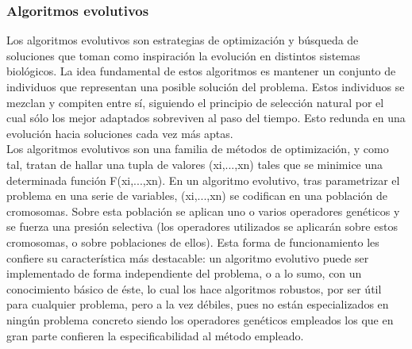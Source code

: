 \documentclass{article}
\begin{document}
\subsubsection{Algoritmos evolutivos}
Los algoritmos evolutivos son estrategias de optimización y búsqueda de soluciones que toman como inspiración la evolución en distintos sistemas biológicos. La idea fundamental de estos algoritmos es mantener un conjunto de individuos que representan una posible solución del problema. Estos individuos se mezclan y compiten entre sí, siguiendo el principio de selección natural por el cual sólo los mejor adaptados sobreviven al paso del tiempo. Esto redunda en una evolución hacia soluciones cada vez más aptas\cite{rf1}. \\
Los algoritmos evolutivos son una familia de métodos de optimización, y como tal, tratan de hallar una tupla de valores (xi,...,xn) tales que se minimice una determinada función F(xi,...,xn). En un algoritmo evolutivo, tras parametrizar el problema en una serie de variables, (xi,...,xn) se codifican en una población de cromosomas. Sobre esta población se aplican uno o varios operadores genéticos y se fuerza una presión selectiva (los operadores utilizados se aplicarán sobre estos cromosomas, o sobre poblaciones de ellos). Esta forma de funcionamiento les confiere su característica más destacable: un algoritmo evolutivo puede ser implementado de forma independiente del problema, o a lo sumo, con un conocimiento básico de éste, lo cual los hace algoritmos robustos, por ser útil para cualquier problema, pero a la vez débiles, pues no están especializados en ningún problema concreto siendo los operadores genéticos empleados los que en gran parte confieren la especificabilidad al método empleado\cite{rf3}. 
\newpage
\end{document}
